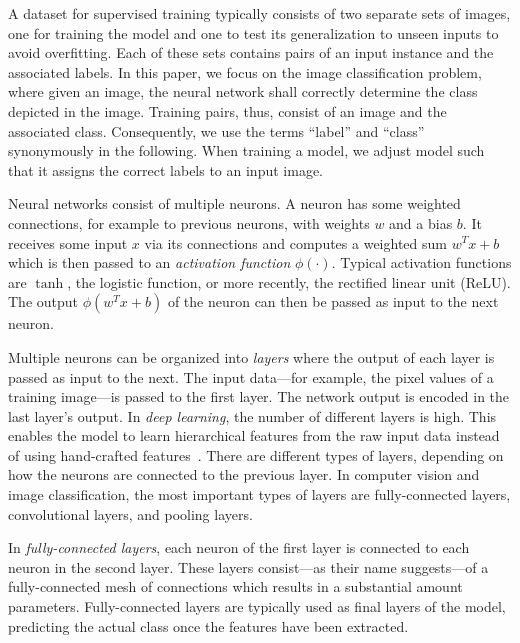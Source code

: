 \documentclass[conference]{IEEEtran}
\begin{document}
A dataset for supervised training typically consists of two separate sets of images, one for training the model and one to test its generalization to unseen inputs to avoid overfitting.
Each of these sets contains pairs of an input instance and the associated labels.
In this paper, we focus on the image classification problem, where given an image, the neural network shall correctly determine the class depicted in the image.
Training pairs, thus, consist of an image and the associated class.
Consequently, we use the terms ``label'' and ``class'' synonymously in the following.
When training a model, we adjust model such that it assigns the correct labels to an input image.

Neural networks consist of multiple neurons.
A neuron has some weighted connections, for example to previous neurons, with weights $w$ and a bias $b$.
It receives some input $x$ via its connections and computes a weighted sum $w^Tx+b$ which is then passed to an \emph{activation function} $\phi(\cdot)$.
Typical activation functions are $\tanh$, the logistic function, or more recently, the rectified linear unit (ReLU).
The output $\phi(w^Tx+b)$ of the neuron can then be passed as input to the next neuron.

Multiple neurons can be organized into \emph{layers} where the output of each layer is passed as input to the next.
The input data---for example, the pixel values of a training image---is passed to the first layer.
The network output is encoded in the last layer's output.
%
In \emph{deep learning}, the number of different layers is high.
This enables the model to learn hierarchical features from the raw input data instead of using hand-crafted features~\cite{chilimbi2014-Project-Adam}.
%
There are different types of layers, depending on how the neurons are connected to the previous layer.
In computer vision and image classification, the most important types of layers are fully-connected layers, convolutional layers, and pooling layers.

In \emph{fully-connected layers}, each neuron of the first layer is connected to each neuron in the second layer.
These layers consist---as their name suggests---of a fully-connected mesh of connections which results in a substantial amount parameters.
Fully-connected layers are typically used as final layers of the model, predicting the actual class once the features have been extracted.
\end{document}
